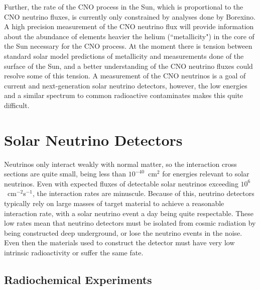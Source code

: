 Further, the rate of the CNO process in the Sun, which is proportional to the CNO neutrino fluxes, is currently only constrained by analyses done by Borexino.
A high precision measurement of the CNO neutrino flux will provide information about the abundance of elements heavier the helium (``metallicity") in the core of the Sun necessary for the CNO process.
At the moment there is tension between standard solar model predictions of metallicity and measurements done of the surface of the Sun, and a better understanding of the CNO neutrino fluxes could resolve some of this tension.
A measurement of the CNO neutrinos is a goal of current and next-generation solar neutrino detectors, however, the low energies and a similar spectrum to common radioactive contaminates makes this quite difficult.

\clearpage

\chapter{Solar Neutrino Detectors}
\label{ch:detectors}

Neutrinos only interact weakly with normal matter, so the interaction cross sections are quite small, being less than $10^{-40}$~cm$^2$ for energies relevant to solar neutrinos.
Even with expected fluxes of detectable solar neutrinos exceeding $10^6$~cm$^{-2}$s$^{-1}$, the interaction rates are minuscule.
Because of this, neutrino detectors typically rely on large masses of target material to achieve a reasonable interaction rate, with a solar neutrino event a day being quite respectable.
These low rates mean that neutrino detectors must be isolated from cosmic radiation by being constructed deep underground, or lose the neutrino events in the noise.
Even then the materials used to construct the detector must have very low intrinsic radioactivity or suffer the same fate.

\section{Radiochemical Experiments}

